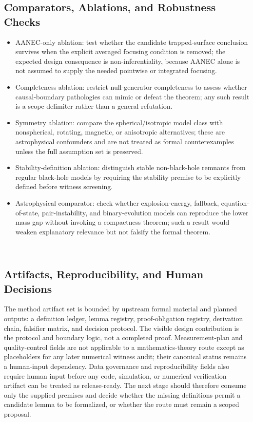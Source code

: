 \documentclass[conference]{IEEEtran}
\begin{document}
\subsection{Comparators, Ablations, and Robustness Checks}
\begin{itemize}
\item AANEC-only ablation: test whether the candidate trapped-surface conclusion survives when the explicit averaged focusing condition is removed; the expected design consequence is non-inferentiality, because AANEC alone is not assumed to supply the needed pointwise or integrated focusing.
\item Completeness ablation: restrict null-generator completeness to assess whether causal-boundary pathologies can mimic or defeat the theorem; any such result is a scope delimiter rather than a general refutation.
\item Symmetry ablation: compare the spherical/isotropic model class with nonspherical, rotating, magnetic, or anisotropic alternatives; these are astrophysical confounders and are not treated as formal counterexamples unless the full assumption set is preserved.
\item Stability-definition ablation: distinguish stable non-black-hole remnants from regular black-hole models by requiring the stability premise to be explicitly defined before witness screening.
\item Astrophysical comparator: check whether explosion-energy, fallback, equation-of-state, pair-instability, and binary-evolution models can reproduce the lower mass gap without invoking a compactness theorem; such a result would weaken explanatory relevance but not falsify the formal theorem.
\end{itemize}~\cite{cite_07d6df5d6978a1fc,cite_42e341ff6471ce89,cite_7a407c865faafd11,cite_7a44e6730c44cb39,cite_f634820e22d7a238,cite_fd0f77b2a173c0ab}

\subsection{Artifacts, Reproducibility, and Human Decisions}
The method artifact set is bounded by upstream formal material and planned outputs: a definition ledger, lemma registry, proof-obligation registry, derivation chain, falsifier matrix, and decision protocol. The visible design contribution is the protocol and boundary logic, not a completed proof. Measurement-plan and quality-control fields are not applicable to a mathematics-theory route except as placeholders for any later numerical witness audit; their canonical status remains a human-input dependency. Data governance and reproducibility fields also require human input before any code, simulation, or numerical verification artifact can be treated as release-ready. The next stage should therefore consume only the supplied premises and decide whether the missing definitions permit a candidate lemma to be formalized, or whether the route must remain a scoped proposal.~\cite{cite_63476e0b002da386}
\end{document}
